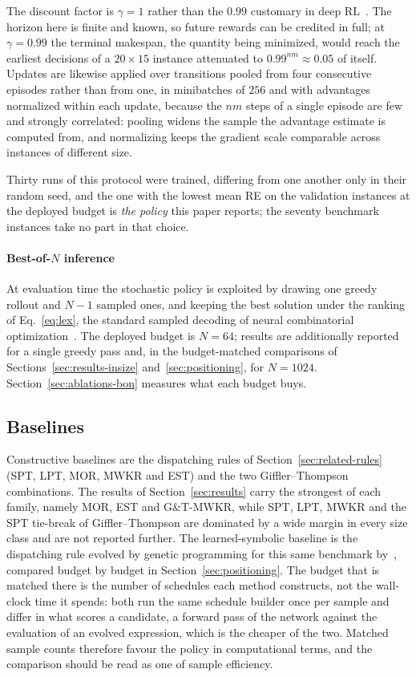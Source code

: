 \documentclass[preprint,12pt]{elsarticle}
\theoremstyle{definition}
\theoremstyle{remark}
\begin{document}
The discount factor is $\gamma=1$ rather than the $0.99$ customary in
deep RL~\citep{Schulman2017}. The horizon here is finite and known,
so future rewards can be credited in full; at $\gamma=0.99$ the
terminal makespan, the quantity being minimized, would reach the
earliest decisions of a $20{\times}15$ instance attenuated to
$0.99^{nm}\approx0.05$ of itself. Updates are likewise applied over
transitions pooled from four consecutive episodes rather than from
one, in minibatches of $256$ and with advantages normalized within
each update, because the $nm$ steps of a single episode are few and
strongly correlated: pooling widens the sample the advantage estimate
is computed from, and normalizing keeps the gradient scale
comparable across instances of different size.

Thirty runs of this protocol were trained, differing from one
another only in their random seed, and the one with the lowest mean
RE on the validation instances at the deployed budget is \emph{the
policy} this paper reports; the seventy benchmark instances take no
part in that choice.

\paragraph{Best-of-$N$ inference} At evaluation time the stochastic
policy is exploited by drawing one greedy rollout and $N-1$ sampled
ones, and keeping the best solution under the ranking of
Eq.~\eqref{eq:lex}, the standard sampled decoding of neural
combinatorial optimization~\citep{Kool2019}. The deployed budget is
$N{=}64$; results are additionally reported for a single greedy pass
and, in the budget-matched comparisons of
Sections~\ref{sec:results-insize} and~\ref{sec:positioning}, for
$N{=}1024$. Section~\ref{sec:ablations-bon} measures what each budget
buys.

\subsection{Baselines}
\label{sec:baselines}

Constructive baselines are the dispatching rules of
Section~\ref{sec:related-rules} (SPT, LPT, MOR, MWKR and EST) and
the two Giffler--Thompson combinations. The results of
Section~\ref{sec:results} carry the strongest of each family, namely
MOR, EST and G\&T-MWKR, while SPT, LPT, MWKR and the SPT tie-break of
Giffler--Thompson are dominated by a wide margin in every size class
and are not reported further. The
learned-symbolic baseline is the dispatching rule evolved by genetic
programming for this same benchmark by~\citet{DiazGP2026}, compared budget by budget in
Section~\ref{sec:positioning}. The budget that is matched there is the
number of schedules each method constructs, not the wall-clock time it
spends: both run the same schedule builder once per sample and differ
in what scores a candidate, a forward pass of the network against the
evaluation of an evolved expression, which is the cheaper of the two.
Matched sample counts therefore favour the policy in computational
terms, and the comparison should be read as one of sample efficiency.
\end{document}
